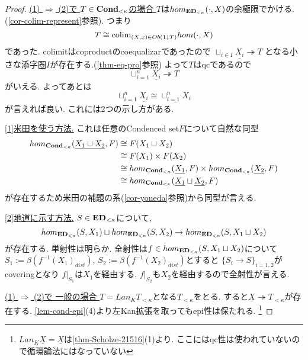 \documentclass[dvipdfmx,a4paper,11pt]{article}
\newcommand{\colim}{{\rm colim}}
\theoremstyle{definition}
\begin{document}
 \begin{proof}

\underline{ (1) $\Rightarrow$ (2)で $T \in {\bf Cond}_{< \kappa}$の場合 }
$T$は$hom_{{\bf ED}_{<\kappa}}(\cdot, X)$の余極限でかける.
(\ref{cor-colim-represent}参照). つまり
 $$
 T \cong  \colim_{(X,x) \in Ob(1 \downarrow T)} hom(\cdot, X)
 $$
 であった.
 colimitはcoproductのcoequalizarであったので
 $\sqcup_{i \in I}\underline{X_i} \twoheadrightarrow T $
 となる小さな添字圏$I$が存在する.(\ref{thm-eq-pro}参照)
よって$T$はqcであるので
$$
\sqcup_{i=1}^{n}\underline{X_i} \twoheadrightarrow T 
$$ 
がいえる.
よってあとは
$$
\sqcup_{i=1}^{n}\underline{X_i}
\cong 
\underline{\sqcup_{i=1}^{n} X_i}
$$
が言えれば良い.
これには2つの示し方がある. 

\underline{[1]米田を使う方法.} これは任意のCondenced set$F$について自然な同型
\begin{align*}
\begin{split}
hom_{{\bf Cond}_{< \kappa}}(\underline{X_1 \sqcup X_2}, F)
& \cong  F(X_1 \sqcup X_2) \\
& \cong F(X_1) \times F(X_2) \\
& \cong hom_{{\bf Cond}_{< \kappa}} (\underline{X_1}, F)\times hom_{{\bf Cond}_{< \kappa}}(\underline{X_2}, F) \\
& \cong hom_{{\bf Cond}_{< \kappa}}(\underline{X_1}\sqcup \underline{X_2}, F) \\
\end{split}
\end{align*}
が存在するため米田の補題の系(\ref{cor-yoneda}参照)から同型が言える. 

\underline{[2]地道に示す方法.} $S \in {\bf ED}_{<\kappa}$について, 
$$
hom_{{\bf ED}_{< \kappa}}(S, X_1) \sqcup hom_{{\bf ED}_{< \kappa}}(S, X_2) \to  hom_{{\bf ED}_{< \kappa}}(S, X_1 \sqcup X_2)
$$
が存在する. 単射性は明らか. 
全射性は$f \in hom_{{\bf ED}_{< \kappa}}(S, X_1 \sqcup X_2)$について$S_1 := \beta(f^{-1}(X_1)_{dist})$, $S_2 := \beta(f^{-1}(X_2)_{dist})$とすると
$\{S_i \to S\}_{i=1,2}$がcoveringとなり
$f|_{S_{1}}$は$X_1$を経由する. $f|_{S_{2}}$も$X_2$を経由するので全射性が言える.

\underline{(1) $\Rightarrow$ (2)で 一般の場合 }
$T = Lan_{K}T_{< \kappa}$となる$T_{< \kappa}$をとる.
すると$\underline{X} \twoheadrightarrow T_{< \kappa}$が存在する.
\ref{lem-cond-epi}(4)より左Kan拡張を取ってもepi性は保たれる. 
\footnote{$Lan_{K}\underline{X}=\underline{X}$は\ref{thm-Scholze-21516}(1)より. ここにはqc性は使われていないので循環論法にはなっていない}


\end{proof}
\end{document}
